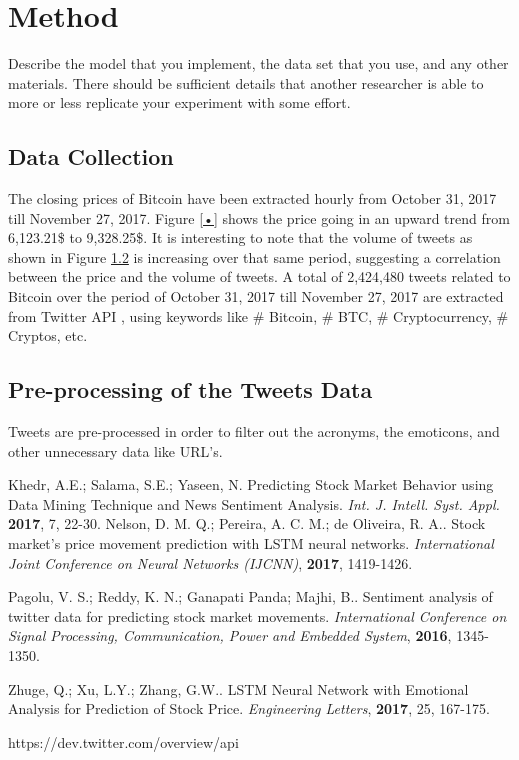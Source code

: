 \documentclass[conference]{IEEEtran}
\begin{document}
\section{Method}
\par Describe the model that you implement, the data set that you use, and any other materials. There should be sufficient details that another researcher is able to more or less replicate your experiment with some effort.
\subsection{Data Collection}
\par The closing prices of Bitcoin have been extracted hourly from October 31, 2017 till November 27, 2017. Figure \ref{•} shows the price going in an upward trend from 6,123.21\$ to 9,328.25\$. It is interesting to note that the volume of tweets as shown in Figure \ref{} is increasing over that same period, suggesting a correlation between the price and the volume of tweets. A total of 2,424,480 tweets related to Bitcoin over the period  of October 31, 2017 till November 27, 2017 are extracted from Twitter API \cite{Twitter API}, using keywords like \# Bitcoin, \# BTC, \# Cryptocurrency, \# Cryptos, etc. 

\subsection{Pre-processing of the Tweets Data}
\par Tweets are pre-processed in order to filter out the acronyms, the emoticons, and other unnecessary data like URL's. 
\begin{thebibliography}{2}
 Khedr, A.E.; Salama, S.E.; Yaseen, N. Predicting Stock Market Behavior using Data Mining Technique and News Sentiment Analysis. \textit{Int. J. Intell. Syst. Appl.} \textbf{2017}, 7, 22-30.
 Nelson, D. M. Q.; Pereira, A. C. M.; de Oliveira, R. A.. Stock market’s price movement
prediction with LSTM neural networks. \textit{International Joint Conference on Neural Networks (IJCNN)}, \textbf{2017}, 1419-1426.

 Pagolu, V. S.; Reddy, K. N.; Ganapati Panda; Majhi, B.. Sentiment
analysis of twitter data for predicting stock market
movements. \textit{International
Conference on Signal Processing, Communication,
Power and Embedded System}, \textbf{2016}, 1345-1350.

 Zhuge, Q.; Xu, L.Y.; Zhang, G.W..  LSTM Neural Network with Emotional
Analysis for Prediction of Stock Price. \textit{Engineering Letters}, \textbf{2017}, 25, 167-175.

 https://dev.twitter.com/overview/api
\end{thebibliography}
\end{document}
